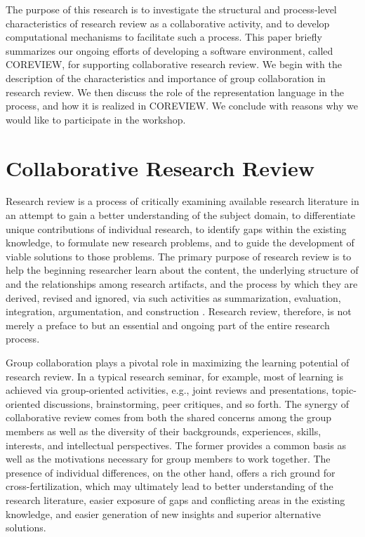 The purpose of this research is to investigate the structural and
process-level characteristics of research review as a collaborative
activity, and to develop computational mechanisms to facilitate such a
process. This paper briefly summarizes our ongoing efforts of developing a
software environment, called COREVIEW, for supporting collaborative
research review.  We begin with the description of the characteristics and
importance of group collaboration in research review. We then discuss the
role of the representation language in the process, and how it is realized
in COREVIEW.  We conclude with reasons why we would like to participate in
the workshop.


\section{Collaborative Research Review}

Research review is a process of critically examining available research
literature in an attempt to gain a better understanding of the subject
domain, to differentiate unique contributions of individual research, to
identify gaps within the existing knowledge, to formulate new research
problems, and to guide the development of viable solutions to those
problems. The primary purpose of research review is to help the beginning
researcher learn about the content, the underlying structure of and the
relationships among research artifacts, and the process by which they are
derived, revised and ignored, via such activities as summarization,
evaluation, integration, argumentation, and construction \cite{csdl-92-03}.
Research review, therefore, is not merely a preface to but an essential and
ongoing part of the entire research process.

Group collaboration plays a pivotal role in maximizing the learning
potential of research review. In a typical research seminar, for example,
most of learning is achieved via group-oriented activities, e.g., joint
reviews and presentations, topic-oriented discussions, brainstorming, peer
critiques, and so forth. The synergy of collaborative review comes from
both the shared concerns among the group members as well as the diversity
of their backgrounds, experiences, skills, interests, and intellectual
perspectives. The former provides a common basis as well as the motivations
necessary for group members to work together. The presence of individual
differences, on the other hand, offers a rich ground for
cross-fertilization, which may ultimately lead to better understanding of
the research literature, easier exposure of gaps and conflicting areas in
the existing knowledge, and easier generation of new insights and superior
alternative solutions.

